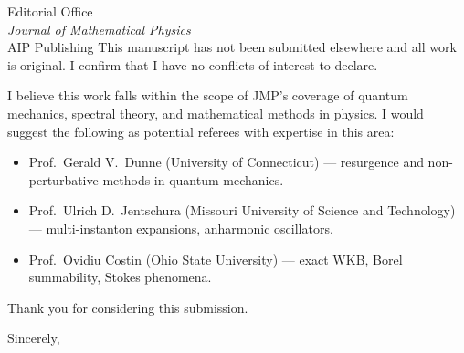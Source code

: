 \documentclass[12pt]{letter}
\begin{document}
\begin{letter}{Editorial Office\\
\textit{Journal of Mathematical Physics}\\
AIP Publishing}
This manuscript has not been submitted elsewhere and all work is
original. I confirm that I have no conflicts of interest to declare.

I believe this work falls within the scope of JMP's coverage of
quantum mechanics, spectral theory, and mathematical methods in
physics. I would suggest the following as potential referees with
expertise in this area:

\begin{itemize}
\item Prof.\ Gerald V.\ Dunne (University of Connecticut) ---
  resurgence and non-perturbative methods in quantum mechanics.
\item Prof.\ Ulrich D.\ Jentschura (Missouri University of Science
  and Technology) --- multi-instanton expansions, anharmonic oscillators.
\item Prof.\ Ovidiu Costin (Ohio State University) --- exact WKB,
  Borel summability, Stokes phenomena.
\end{itemize}

Thank you for considering this submission.

\closing{Sincerely,}

\end{letter}
\end{document}
